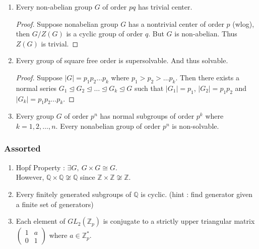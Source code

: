\begin{enumerate}
	\item Every non-abelian group $G$ of order $pq$ has trivial center.
	\begin{proof}
		Suppose nonabelian group $G$ has a nontrivial center of order $p$ (wlog), then $G/Z(G)$ is a cyclic group of order $q$.
		But $G$ is non-abelian. Thus $Z(G)$ is trivial.
	\end{proof}
	\item Every group of square free order is supersolvable. And thus solvable.
	\begin{proof}
		Suppose $|G| = p_1 p_2 \dots p_k$ where $p_1 > p_2 > \dots p_k$. Then there exists a normal series $G_1 \trianglelefteq G_2 \trianglelefteq \dots \trianglelefteq G_k \trianglelefteq G$ such that $|G_1| = p_1$, $|G_2| = p_1p_2$ and $|G_k|=p_1p_2\dots p_k$.
	\end{proof}
	\item Every group $G$ of order $p^n$ has normal subgroups of order $p^k$ where $k = 1,2,\dots,n$. Every nonabelian group of order $p^n$ is non-solvable.
\end{enumerate}

\subsubsection{Assorted}
\begin{enumerate}
	\item Hopf Property : $\exists G,\ G \times G \cong G$.\\
	However, $\mathbb{Q} \times \mathbb{Q} \not\cong \mathbb{Q}$ since $\mathbb{Z} \times \mathbb{Z} \not\cong \mathbb{Z}$.
	\item Every finitely generated subgroups of $\mathbb{Q}$ is cyclic. (hint : find generator given a finite set of generators)
	\item Each element of $GL_2(\mathbb{Z}_p)$ is conjugate to a strictly upper triangular matrix $\begin{pmatrix} 1 & a \\ 0 & 1 \end{pmatrix}$ where $a \in \mathbb{Z}_p^\ast$.
\end{enumerate}
